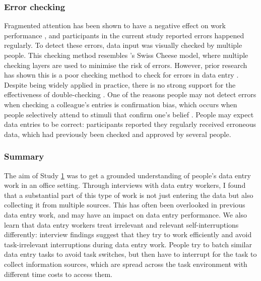 \subsubsection{Error checking}
Fragmented attention has been shown to have a negative effect on work performance \citep{Bailey2001, Carrier2015}, and participants in the current study reported errors happened regularly. To detect these errors, data input was visually checked by multiple people. This checking method resembles \citeauthor{Reason1990}'s \citeyearpar{Reason1990}  Swiss Cheese model, where multiple checking layers are used to minimise the risk of errors. However, prior research has shown this is a poor checking method to check for errors in data entry \citep{Olsen2008, Wiseman2013a}. Despite being widely applied in practice, there is no strong support for the effectiveness of double-checking \citep{Li2016}. One of the reasons people may not detect errors when checking a colleague's entries is confirmation bias, which occurs when people selectively attend to stimuli that confirm one's belief \citep{Lewis1986}. People may expect data entries to be correct: participants reported they regularly received erroneous data, which had previously been checked and approved by several people. 


\subsubsection{Summary}
The aim of Study \hyperref[st:Study1]{1}  was to get a grounded understanding of people's data entry work in an office setting. Through interviews with data entry workers, I found that a substantial part of this type of work is not just entering the data but also collecting it from multiple sources. This has often been overlooked in previous data entry work, and may have an impact on data entry performance. We also learn that data entry workers treat irrelevant and relevant self-interruptions differently: interview findings suggest that they try to work efficiently and avoid task-irrelevant interruptions during data entry work. People try to batch similar data entry tasks to avoid task switches, but then have to interrupt for the task to collect information sources, which are spread across the task environment with different time costs to access them. 

